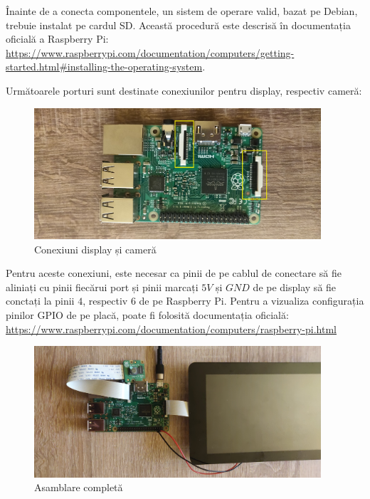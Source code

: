 Înainte de a conecta componentele, un sistem de operare valid, bazat pe Debian, trebuie instalat pe cardul
SD. Această procedură este descrisă în documentația oficială a Raspberry Pi:
\url{https://www.raspberrypi.com/documentation/computers/getting-started.html#installing-the-operating-system}.

Următoarele porturi sunt destinate conexiunilor pentru display, respectiv cameră:

\begin{figure}[H]
	\includegraphics[width=0.95\textwidth, height=0.45\textwidth]{resources/Manual_Connections.jpg}
	\caption{Conexiuni display și cameră}
\end{figure}

Pentru aceste conexiuni, este necesar ca pinii de pe cablul de conectare să fie aliniați cu pinii fiecărui
port și pinii marcați \(5V\) și \(GND\) de pe display să fie conctați la pinii \(4\), respectiv \(6\) de
pe Raspberry Pi. Pentru a vizualiza configurația pinilor GPIO de pe placă, poate fi folosită documentația
oficială: \url{https://www.raspberrypi.com/documentation/computers/raspberry-pi.html}

\begin{figure}[H]
	\includegraphics[width=0.95\textwidth, height=0.45\textwidth]{resources/Manual_Setup.jpg}
	\caption{Asamblare completă}
\end{figure}

